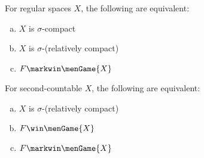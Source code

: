   \begin{cor}
    For regular spaces $X$, the following are equivalent:
      \begin{enumerate}[(a)]
        \item $X$ is $\sigma$-compact
        \item $X$ is $\sigma$-(relatively compact)
        \item $F \markwin \menGame{X}$
      \end{enumerate}
  \end{cor}

  \begin{thm}
    For second-countable $X$, the following are equivalent:
      \begin{enumerate}[(a)]
        \item $X$ is $\sigma$-(relatively compact)
        \item $F \win \menGame{X}$
        \item $F\markwin \menGame{X}$
      \end{enumerate}
  \end{thm}

